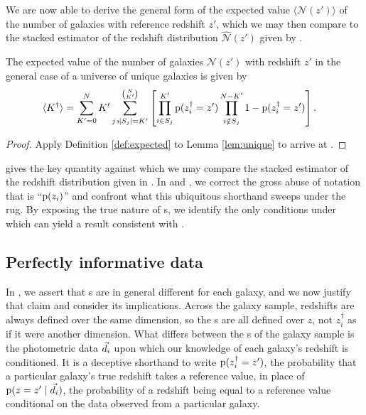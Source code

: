 We are now able to derive the general form of the expected value $\langle \mathcal{N}(z')\rangle$ of the number of galaxies with reference redshift $z'$, which we may then compare to the stacked estimator of the redshift distribution $\hat{\mathcal{N}}(z')$ given by .
\begin{theorem}\label{thm:general}
	The expected value of the number of galaxies $\mathcal{N}(z')$ with redshift $z'$ in the general case of a universe of unique galaxies is given by
	\begin{align}
	\eqlabel{eqn:complete}
	\langle K^{\dagger} \rangle &= \sum_{K' = 0}^{N} K' \sum_{j \backepsilon |S_{j}| = K'}^{\binom{N}{K'}} \left[ \prod_{i \in S_{j}}^{K'} \pr{z_{i}^{\dagger} = z'} \prod_{i \notin S_{j}}^{N - K'} 1 - \pr{z_{i}^{\dagger} = z'} \right].
	\end{align}
\end{theorem}
\begin{proof}
	Apply Definition \ref{def:expected} to Lemma \ref{lem:unique} to arrive at .
\end{proof}

 gives the key quantity against which we may compare the stacked estimator of the redshift distribution given in .
In  and , we correct the gross abuse of notation that is ``$\mathrm{p}(z_{i})$'' and confront what this ubiquitous shorthand sweeps under the rug.
By exposing the true nature of \pzpdf s, we identify the only conditions under which  can yield a result consistent with .

\subsection{Perfectly informative data}

In , we assert that \pzpdf s are in general different for each galaxy, and we now justify that claim and consider its implications.
Across the galaxy sample, redshifts are always defined over the same dimension, so the \pzpdf s are all defined over $z$, not $z_{i}^{\dagger}$ as if it were another dimension.
What differs between the \pzpdf s of the galaxy sample is the photometric data $\vec{d}_{i}$ upon which our knowledge of each galaxy's redshift is conditioned.
It is a deceptive shorthand to write ${\mathrm{p}(z_{i}^{\dagger} = z')}$, the probability that a particular galaxy's true redshift takes a reference value, in place of ${\mathrm{p}(z = z' \mid \vec{d}_{i})}$, the probability of a redshift being equal to a reference value conditional on the data observed from a particular galaxy.

